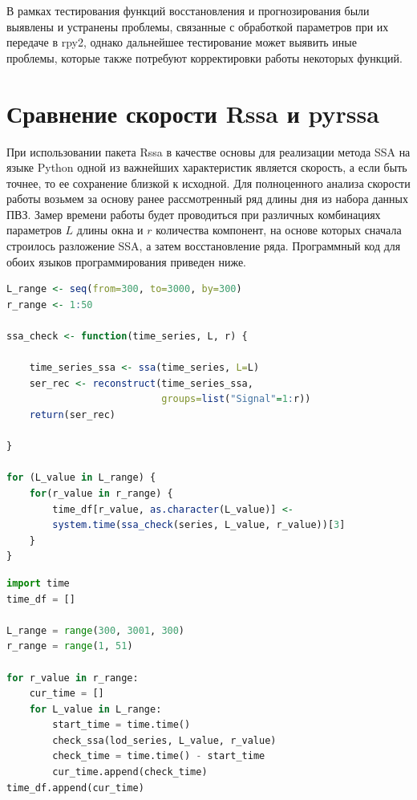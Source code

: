 \documentclass[specialist,
			   substylefile = spbu_report.rtx,
			   subf,href,colorlinks=true, 12pt]{disser}
\begin{document}
В рамках тестирования функций восстановления и прогнозирования были выявлены и устранены проблемы, связанные с обработкой параметров при их передаче в rpy2, однако дальнейшее тестирование может выявить иные проблемы, которые также потребуют корректировки работы некоторых функций.

\chapter{Сравнение скорости Rssa и pyrssa}
	
При использовании пакета Rssa в качестве основы для реализации метода SSA на языке Python одной из важнейших характеристик является скорость, а если быть точнее, то ее сохранение близкой к исходной. Для полноценного анализа скорости работы возьмем за основу ранее рассмотренный ряд длины дня из набора данных ПВЗ. Замер времени работы будет проводиться при различных комбинациях параметров $L$ длины окна и $r$ количества компонент, на основе которых сначала строилось разложение SSA, а затем восстановление ряда. Программный код для обоих языков программирования приведен ниже.

\begin{lstlisting}[language=R, caption=Программный код для анализа времени работы на языке R.]
L_range <- seq(from=300, to=3000, by=300)
r_range <- 1:50	

ssa_check <- function(time_series, L, r) {
	
	time_series_ssa <- ssa(time_series, L=L)
	ser_rec <- reconstruct(time_series_ssa,
	                       groups=list("Signal"=1:r))
	return(ser_rec)
	
}

for (L_value in L_range) {
	for(r_value in r_range) {
		time_df[r_value, as.character(L_value)] <- 
		system.time(ssa_check(series, L_value, r_value))[3]
	}
}
\end{lstlisting}

\begin{lstlisting}[language=Python, caption=Программный код для анализа времени работы на языке Python.]
import time
time_df = []

L_range = range(300, 3001, 300)
r_range = range(1, 51)

for r_value in r_range:
	cur_time = []
	for L_value in L_range:
		start_time = time.time()
		check_ssa(lod_series, L_value, r_value)
		check_time = time.time() - start_time
		cur_time.append(check_time)
time_df.append(cur_time)
\end{lstlisting}
\end{document}
